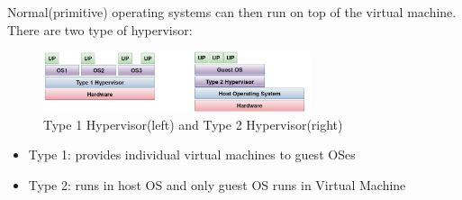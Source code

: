 \documentclass[12pt]{article}
\theoremstyle{definition}
\begin{document}
Normal(primitive) operating systems can then run on top of the virtual machine.\\
There are two type of hypervisor:
\begin{figure}[h]
\centering
\includegraphics[width = 0.7\textwidth]{1_8.png}
\caption{Type 1 Hypervisor(left) and Type 2 Hypervisor(right)}
\end{figure}
\begin{itemize}
  \item Type 1: provides individual virtual machines to guest OSes
  \item Type 2: runs in host OS and only guest OS runs in Virtual Machine
\end{itemize}
\end{document}
